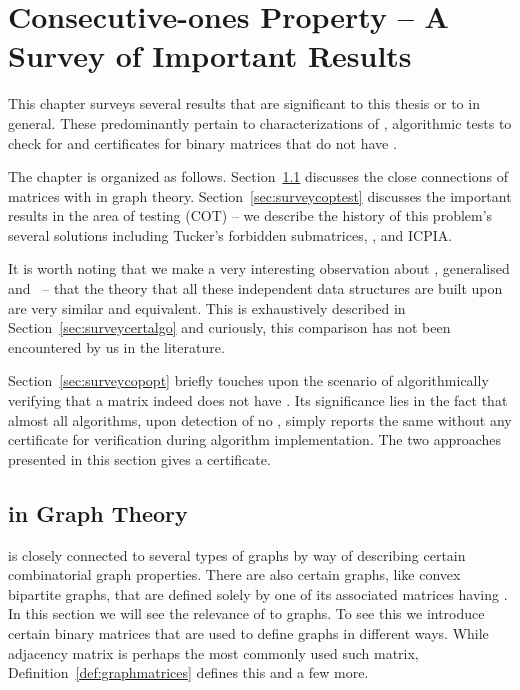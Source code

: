 \xclearpage


\chapter[COP -- A Survey]{Consecutive-ones Property -- A Survey of
  Important Results}
\label{ch:copsurvey}

This chapter surveys several results that are significant to this
thesis or to \COP in general. These predominantly pertain to
characterizations of \COP, algorithmic tests to check for \COP
and certificates for binary matrices that do not have \COP.


The chapter is organized as follows. Section~\ref{sec:copgraphtheory}
discusses the close connections of matrices with \COP in graph
theory. Section~\ref{sec:surveycoptest} discusses the important
results in the area of \cop testing (COT) -- we describe the history
of this problem's several solutions including Tucker's forbidden
submatrices, \PQtree, \PQRtree and ICPIA. 

It is worth noting that we make a very interesting observation about
\PQRtree, generalised \PQtree and \gPQtree\ -- that the theory that
all these independent data structures are built upon are very similar
and equivalent. This is exhaustively described in
Section~\ref{sec:surveycertalgo} and curiously, this comparison has
not been encountered by us in the literature.

Section~\ref{sec:surveycopopt} briefly touches upon the scenario of
algorithmically verifying that a matrix indeed does not have \COP. Its
significance lies in the fact that almost all \COT algorithms, upon
detection of no \COP, simply reports the same without any certificate
for verification during algorithm implementation. The two approaches
presented in this section gives a certificate.


\section{\COP in Graph Theory}
\label{sec:copgraphtheory}

\COP is closely connected to several types of graphs by way of
describing certain combinatorial graph properties. There are also
certain graphs, like convex bipartite graphs, that are defined solely
by one of its associated matrices having \COP.  In this section we will
see the relevance of \cop to graphs.  To see this we introduce certain
binary matrices that are used to define graphs in different
ways. While adjacency matrix is perhaps the most commonly used such
matrix, Definition~\ref{def:graphmatrices} defines this and a few
more.

